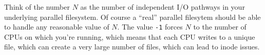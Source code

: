 Think of the number $N$ as the number of independent I/O pathways in
your underlying parallel filesystem.  Of course a ``real'' parallel
filesytem should be able to handle any reasonable value of $N$.  The
value {\tt -1} forces $N$ to the number of CPUs on which you're
running, which means that each CPU writes to a unique file, which can
create a very large number of files, which can lead to inode issues.
